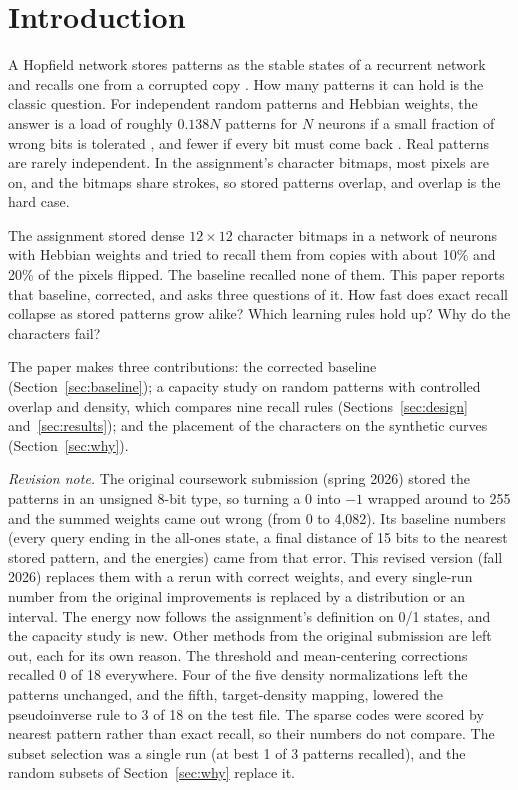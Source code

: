 \section{Introduction}

A Hopfield network stores patterns as the stable states of a recurrent network and recalls one from a corrupted copy \cite{hopfield1982}. How many patterns it can hold is the classic question. For independent random patterns and Hebbian weights, the answer is a load of roughly $0.138N$ patterns for $N$ neurons if a small fraction of wrong bits is tolerated \cite{amit1985}, and fewer if every bit must come back \cite{mceliece1987}. Real patterns are rarely independent. In the assignment's character bitmaps, most pixels are on, and the bitmaps share strokes, so stored patterns overlap, and overlap is the hard case.

The assignment stored  dense $12 \times 12$ character bitmaps in a network of  neurons with Hebbian weights and tried to recall them from copies with about 10\% and 20\% of the pixels flipped. The baseline recalled none of them. This paper reports that baseline, corrected, and asks three questions of it. How fast does exact recall collapse as stored patterns grow alike? Which learning rules hold up? Why do the characters fail?

The paper makes three contributions: the corrected baseline (Section~\ref{sec:baseline}); a capacity study on random patterns with controlled overlap and density, which compares nine recall rules (Sections~\ref{sec:design} and~\ref{sec:results}); and the placement of the characters on the synthetic curves (Section~\ref{sec:why}).

\emph{Revision note.} The original coursework submission (spring 2026) stored the patterns in an unsigned 8-bit type, so turning a 0 into $-1$ wrapped around to 255 and the summed weights came out wrong (from 0 to 4,082). Its baseline numbers (every query ending in the all-ones state, a final distance of 15 bits to the nearest stored pattern, and the energies) came from that error. This revised version (fall 2026) replaces them with a rerun with correct weights, and every single-run number from the original improvements is replaced by a distribution or an interval. The energy now follows the assignment's definition on 0/1 states, and the capacity study is new. Other methods from the original submission are left out, each for its own reason. The threshold and mean-centering corrections recalled 0 of 18 everywhere. Four of the five density normalizations left the patterns unchanged, and the fifth, target-density mapping, lowered the pseudoinverse rule to 3 of 18 on the test file. The sparse codes were scored by nearest pattern rather than exact recall, so their numbers do not compare. The subset selection was a single run (at best 1 of 3 patterns recalled), and the random subsets of Section~\ref{sec:why} replace it.

